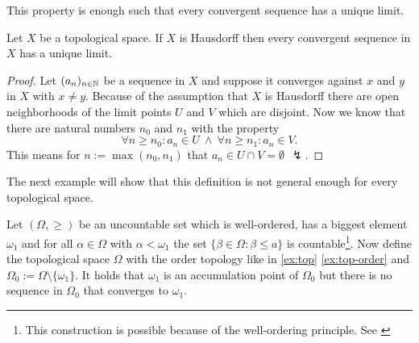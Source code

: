 This property is enough such that every convergent sequence has a unique limit.

\begin{thm}
  Let $X$ be a topological space. If $X$ is Hausdorff then every convergent sequence in $X$ has a unique limit.
\end{thm}

\begin{proof}
  Let $(a_n)_{n \in \mathbb{N}}$ be a sequence in $X$ and suppose it converges against $x$ and $y$ in $X$ with $x \neq y$. 
  Because of the assumption that $X$ is Hausdorff there are open neighborhoods of the limit points $U$ and $V$ which are disjoint. 
  Now we know that there are natural numbers $n_0$ and $n_1$ with the property
  \begin{equation*}
    \forall n \geq n_0\colon a_n \in U \: \land \: \forall n \geq n_1\colon a_n \in V.
  \end{equation*}
  This means for $n := \max(n_0, n_1)$ that $a_n \in U \cap V = \emptyset \:\: \lightning$.
\end{proof}

The next example will show that this definition is not general enough for every topological space.

\begin{ex}\label{ex:ordertop-uncount}
  Let $(\Omega, \geq)$ be an uncountable set which is well-ordered, has a biggest element $\omega_1$ and for all $\alpha \in \Omega$ with $\alpha < \omega_1$ the set $\{\beta \in \Omega\colon \beta \leq a\}$ is countable\footnote{This construction is possible because of the well-ordering principle. See \cite[p. 53]{BvQMT}}.
  Now define the topological space $\Omega$ with the order topology like in \ref{ex:top} \ref{ex:top-order} and $\Omega_0 := \Omega\setminus \{\omega_1\}$.
  It holds that $\omega_1$ is an accumulation point of $\Omega_0$ but there is no sequence in $\Omega_0$ that converges to $\omega_1$.
\end{ex}

